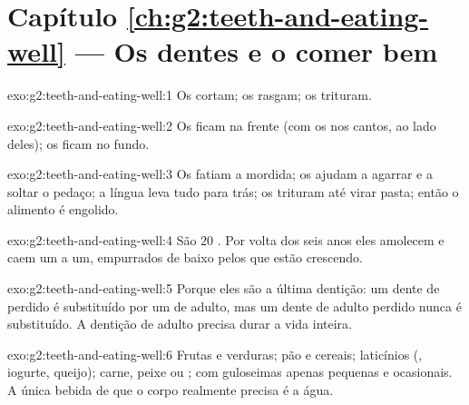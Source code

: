 \section*{Capítulo \ref{ch:g2:teeth-and-eating-well} --- Os dentes e o comer bem}

\begin{solution}{exo:g2:teeth-and-eating-well:1}
Os  cortam; os  rasgam; os  trituram.
\end{solution}

\begin{solution}{exo:g2:teeth-and-eating-well:2}
Os  ficam na frente (com os  nos cantos, ao lado
deles); os  ficam no fundo.
\end{solution}

\begin{solution}{exo:g2:teeth-and-eating-well:3}
Os  fatiam a mordida; os  ajudam a agarrar e a
soltar o pedaço; a língua leva tudo para trás; os  trituram
até virar pasta; então o alimento é engolido.
\end{solution}

\begin{solution}{exo:g2:teeth-and-eating-well:4}
São $20$ . Por volta dos seis anos eles amolecem e
caem um a um, empurrados de baixo pelos  que estão
crescendo.
\end{solution}

\begin{solution}{exo:g2:teeth-and-eating-well:5}
Porque eles são a última dentição: um dente de  perdido é
substituído por um de adulto, mas um dente de adulto perdido nunca é
substituído. A dentição de adulto precisa durar a vida inteira.
\end{solution}

\begin{solution}{exo:g2:teeth-and-eating-well:6}
Frutas e verduras; pão e cereais; laticínios (, iogurte,
queijo); carne, peixe ou ; com guloseimas apenas pequenas e
ocasionais. A única bebida de que o corpo realmente precisa é a
água.
\end{solution}


